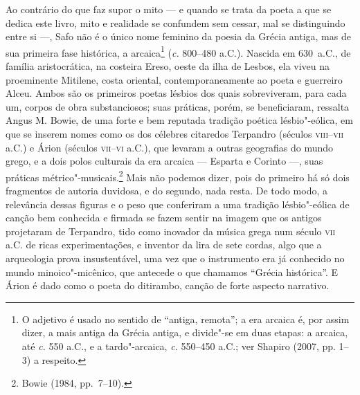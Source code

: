 \noindent{}Ao contrário do que faz supor o mito --- e quando se trata da poeta a que se
dedica este livro, mito e realidade se confundem sem cessar, mal se
distinguindo entre si ---, Safo não é o único nome feminino da poesia da Grécia
	antiga, mas de sua primeira fase histórica, a arcaica\footnote{ O adjetivo é
	usado no sentido de “antiga, remota”; a era arcaica é, por assim dizer, a mais
	antiga da Grécia antiga, e divide"-se em duas etapas: a arcaica, até \textit{c.}
	550 a.C., e a tardo"-arcaica, \textit{c.} 550--450 a.C.; ver Shapiro (2007, pp.
	1--3) a respeito.} (\textit{c.} 800--480 a.C.). Nascida em 630~a.C., de família
aristocrática, na costeira Ereso, oeste da ilha de Lesbos, ela viveu na
proeminente Mitilene, costa oriental, contemporaneamente ao poeta e guerreiro
Alceu. Ambos são os primeiros poetas lésbios dos quais sobreviveram, para cada
um, corpos de obra substanciosos; suas práticas, porém, se beneficiaram,
ressalta Angus M. Bowie, de uma forte e bem reputada tradição
poética lésbio"-eólica, em que se inserem nomes como os dos célebres citaredos
Terpandro (séculos \textsc{viii}--\textsc{vii} a.C.) e Árion (séculos
\textsc{vii}--\textsc{vi} a.C.), que levaram a
outras geografias do mundo grego, e a dois polos culturais da era arcaica ---
	Esparta e Corinto ---, suas práticas métrico"-musicais.\footnote{ Bowie (1984,
	pp.~7--10).} Mais não podemos dizer,
pois do primeiro há só dois fragmentos de autoria duvidosa, e do segundo, nada
resta. De todo modo, a relevância dessas figuras e o peso que conferiram a uma
tradição lésbio"-eólica de canção bem conhecida e firmada se
fazem sentir na imagem que os antigos projetaram de Terpandro, tido como
inovador da música grega num século \textsc{vii} a.C. de ricas experimentações, e
inventor da lira de sete cordas, algo que a arqueologia prova insustentável,
uma vez que o instrumento era já conhecido no mundo minoico"-micênico, que
antecede o que chamamos “Grécia histórica”. E Árion é dado como o
poeta do ditirambo, canção de forte aspecto narrativo.

